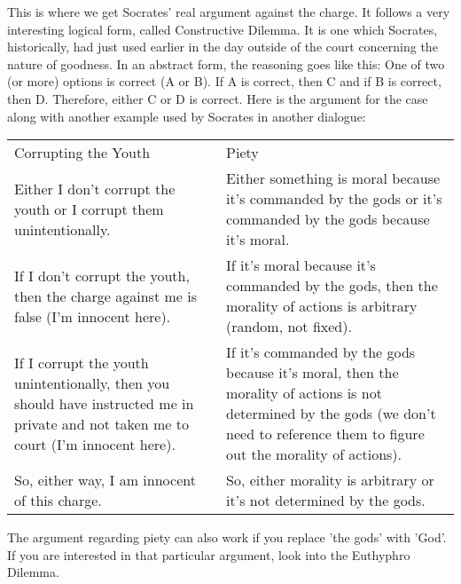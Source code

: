 This is where we get Socrates' real argument against the charge. It follows a very interesting logical form, called Constructive Dilemma. It is one which Socrates, historically, had just used earlier in the day outside of the court concerning the nature of goodness. In an abstract form, the reasoning goes like this: One of two (or more) options is correct (A or B). If A is correct, then  C and if B is correct, then D. Therefore, either C or D is correct. Here is the argument for the case along with another example used by Socrates in another dialogue:
\noindent
\begin{tabular}{p{2.5in}|p{2.5in}}
Corrupting the Youth& Piety\\

    Either I don't corrupt the youth or I corrupt them unintentionally.&Either something is moral because it's commanded by the gods or it's commanded by the gods because it's moral.\\
    If I don't corrupt the youth, then the charge against me is false (I'm innocent here).&If it's moral because it's commanded by the gods, then the morality of actions is arbitrary (random, not fixed).\\
    If I corrupt the youth unintentionally, then you should have instructed me in private and not taken me to court (I'm innocent here).&If it's commanded by the gods because it's moral, then the morality of actions is not determined by the gods (we don't need to reference them to figure out the morality of actions).\\
    So, either way, I am innocent of this charge.&  So, either morality is arbitrary or it's not determined by the gods.\\
\end{tabular}

The argument regarding piety can also work if you replace 'the gods' with 'God'. If you are interested in that particular argument, look into the Euthyphro Dilemma.